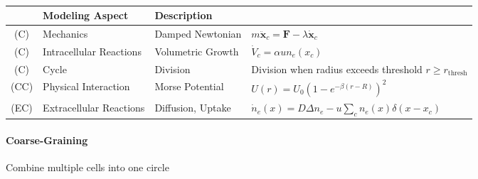 \begin{table}[H]
    \centering
    \def\arraystretch{1.5}
    \begin{tabularx}{\textwidth}{cllX}
        & \textbf{Modeling Aspect} & \textbf{Description} & \\
        \midrule
        (C) & Mechanics & Damped Newtonian &
        $m \ddot{\textbf{x}}_c = \textbf{F} - \lambda \dot{\textbf{x}}_c$\\
        (C) & Intracellular Reactions & Volumetric Growth & $\dot{V}_c = \alpha u n_e(x_c)$\\
        (C) & Cycle & Division & Division when radius exceeds threshold $r\geq r_\text{thresh}$\\
        (CC) & Physical Interaction & Morse Potential &
        $U(r) = U_0 \left(1- e^{-\beta (r-R)} \right)^2$\\
        (EC) & Extracellular Reactions & Diffusion, Uptake &
        $\dot{n}_e(x) = D\Delta n_e - u \sum_c n_e(x)\delta(x-x_c)$\\
        \bottomrule
    \end{tabularx}
    \caption[Simulation Aspects of Bacterial Branching]{}
\end{table}

\paragraph{Coarse-Graining}
Combine multiple cells into one circle \cite{Graham1998}

